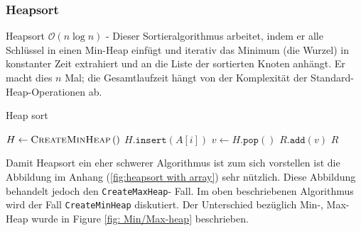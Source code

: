 \documentclass[a4paper]{article}
\begin{document}
    \subsubsection{Heapsort}\label{Heapsort}
        Heapsort $\mathcal{O}(n \log n)$ - Dieser Sortieralgorithmus arbeitet, indem er alle Schlüssel in einen Min-Heap einfügt und iterativ das Minimum (die Wurzel) in konstanter Zeit extrahiert und an die Liste der sortierten Knoten anhängt. Er macht dies $n$ Mal; die Gesamtlaufzeit hängt von der Komplexität der Standard-Heap-Operationen ab.
        
        \begin{algorithm}[h]
            \caption{Heap sort}
            \label{alg:HeapSort}
            \begin{algorithmic} 
            \State $H \gets \textsc{CreateMinHeap}\left(\right)$
            \State $H\texttt{.insert}\left(A\left[i\right]\right)$
            \EndFor
            \State $v \gets H\texttt{.pop}\left(\right)$
            \State $R\texttt{.add}\left(v\right)$
            \EndFor
            \State \Return $R$
            \end{algorithmic}
        \end{algorithm}
        
    Damit Heapsort ein eher schwerer Algorithmus ist zum sich vorstellen ist die Abbildung im Anhang (\ref{fig:heapsort with array}) sehr nützlich. Diese Abbildung behandelt jedoch den \texttt{CreateMaxHeap}- Fall. Im oben beschriebenen Algorithmus wird der Fall \texttt{CreateMinHeap}  diskutiert. Der Unterschied bezüglich Min-, Max-Heap wurde in Figure \ref{fig: Min/Max-heap} beschrieben.\label{VerlinkzuHeapSortText}


    
\end{document}
